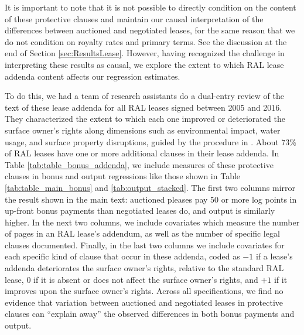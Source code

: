 \begin{appendices}
It is important to note that it is not possible to directly condition on the content of these protective clauses and maintain our causal interpretation of the differences between auctioned and negotiated leases, for the same reason that we do not condition on royalty rates and primary terms.  See the discussion at the end of Section \ref{sec:ResultsLease}.  However, having recognized the challenge in interpreting these results as causal, we explore the extent to which RAL lease addenda content affects our regression estimates.

To do this, we had a team of research assistants do a dual-entry review of the text of these lease addenda for all RAL leases signed between 2005 and 2016.  They characterized the extent to which each one improved or deteriorated the surface owner's rights along dimensions such as environmental impact, water usage, and surface property disruptions, guided by the procedure in \cite{vissing_one--many_2017}.  About 73\% of RAL leases have one or more additional clauses in their lease addenda.  In Table \ref{tab:table_bonus_addenda}, we include measures of these protective clauses in bonus and output regressions like those shown in Table \ref{tab:table_main_bonus} and \ref{tab:output_stacked}.  The first two columns mirror the result shown in the main text: auctioned pleases pay 50 or more log points in up-front bonus payments than negotiated leases do, and output is similarly higher.  In the next two columns, we include covariates which measure the number of pages in an RAL lease's addendum, as well as the number of specific legal clauses documented.  Finally, in the last two columns we include covariates for each specific kind of clause that occur in these addenda, coded as $-1$ if a lease's addenda deteriorates the surface owner's rights, relative to the standard RAL lease, $0$ if it is absent or does not affect the surface owner's rights, and $+1$ if it improves upon the surface owner's rights.  Across all specifications, we find no evidence that variation between auctioned and negotiated leases in protective clauses can ``explain away'' the observed differences in both bonus payments and output. 


\end{appendices}
